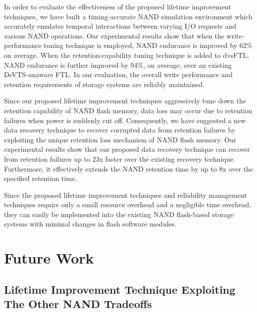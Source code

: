 In order to evaluate the effectiveness of the proposed lifetime improvement techniques, we have built a timing-accurate NAND simulation environment which accurately emulates temporal interactions between varying I/O requests and various NAND operations.
Our experimental results show that when the write-performance tuning technique is employed, NAND endurance is improved by 62\% on average.
When the retention-capability tuning technique is added to dvsFTL, NAND endurance is further improved by 94\%, on average, over an existing DeVTS-unaware FTL.
In our evaluation, the overall write performance and retention requirements of storage systems are reliably maintained.


Since our proposed lifetime improvement techniques aggressively tune down the retention capability of NAND flash memory, data loss may occur due to retention failures when power is suddenly cut off.
Consequently, we have suggested a new data recovery technique to recover corrupted data from retention failures by exploiting the unique retention loss mechanism of NAND flash memory.
Our experimental results show that our proposed data recovery technique can recover from retention failures up to 23x faster over the existing recovery technique.
Furthermore, it effectively extends the NAND retention time by up to 8x over the specified retention time.


Since the proposed lifetime improvement techniques and reliability management techniques require only a small resource overhead and a negligible time overhead, they can easily be implemented into the existing NAND flash-based storage systems with minimal changes in flash software modules.


\section{Future Work}


\subsection{Lifetime Improvement Technique Exploiting\\ The Other NAND Tradeoffs}

